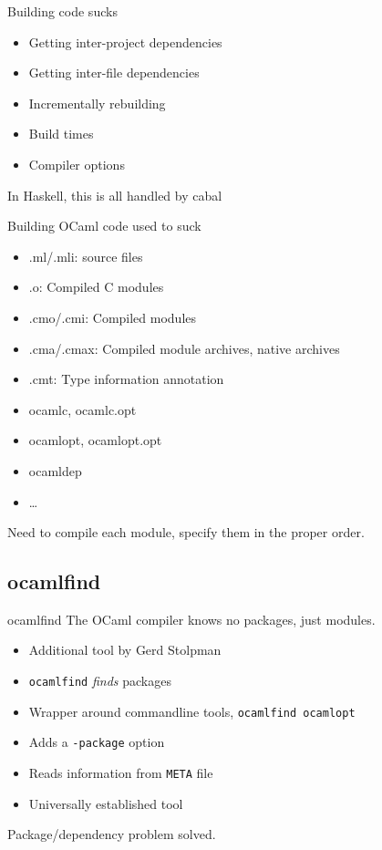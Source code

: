 \documentclass{beamer}
\begin{document}
\begin{frame}{Building code sucks}
  \begin{itemize}
    \item Getting inter-project dependencies
    \item Getting inter-file dependencies
    \item Incrementally rebuilding
    \item Build times
    \item Compiler options
  \end{itemize}
  In Haskell, this is all handled by cabal
\end{frame}

\begin{frame}{Building OCaml code used to suck}
  \begin{itemize}
    \item .ml/.mli: source files
    \item .o: Compiled C modules
    \item .cmo/.cmi: Compiled modules
    \item .cma/.cmax: Compiled module archives, native archives
    \item .cmt: Type information annotation
  \end{itemize}
  \begin{itemize}
    \item ocamlc, ocamlc.opt
    \item ocamlopt, ocamlopt.opt
    \item ocamldep
    \item …
  \end{itemize}
  Need to compile each module, specify them in the proper order.
\end{frame}

\subsection{ocamlfind}

\begin{frame}{ocamlfind}
  The OCaml compiler knows no packages, just modules.
  \begin{itemize}
    \item Additional tool by Gerd Stolpman
    \item \texttt{ocamlfind} \emph{finds} packages
    \item Wrapper around commandline tools, \texttt{ocamlfind ocamlopt}
    \item Adds a \texttt{-package} option
    \item Reads information from \texttt{META} file
    \item Universally established tool
  \end{itemize}
  Package/dependency problem solved.
\end{frame}
\end{document}
